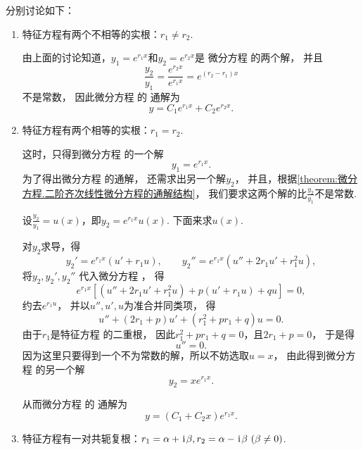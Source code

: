 分别讨论如下：\begin{enumerate}
	\item 特征方程有两个不相等的实根：\(r_1 \neq r_2\).

	由上面的讨论知道，\(y_1 = e^{r_1 x}\)和\(y_2 = e^{r_2 x}\)是
	微分方程  的两个解，
	并且\[
		\frac{y_2}{y_1} = \frac{e^{r_2 x}}{e^{r_1 x}} = e^{(r_2-r_1) x}
	\]不是常数，
	因此微分方程  的
	通解为\begin{equation}
		y = C_1 e^{r_1 x} + C_2 e^{r_2 x}.
	\end{equation}

	\item 特征方程有两个相等的实根：\(r_1 = r_2\).

	这时，只得到微分方程  的一个解\[
		y_1 = e^{r_1 x}.
	\]
	为了得出微分方程  的通解，
	还需求出另一个解\(y_2\)，
	并且，根据\cref{theorem:微分方程.二阶齐次线性微分方程的通解结构}，
	我们要求这两个解的比\(\frac{y_2}{y_1}\)不是常数.

	设\(\frac{y_2}{y_1} = u(x)\)，即\(y_2 = e^{r_1 x} u(x)\).
	下面来求\(u(x)\).

	对\(y_2\)求导，得\[
		y_2' = e^{r_1 x} (u' + r_1 u),
		\qquad
		y_2'' = e^{r_1 x} (u'' + 2 r_1 u' + r_1^2 u),
	\]
	将\(y_2,y_2',y_2''\)
	代入微分方程 ，
	得\[
		e^{r_1 x} [(u'' + 2 r_1 u' + r_1^2 u) + p(u' + r_1 u) + qu] = 0,
	\]
	约去\(e^{r_1 u}\)，
	并以\(u'',u',u\)为准合并同类项，
	得\[
		u'' + (2 r_1 + p) u' + (r_1^2 + p r_1 + q) u = 0.
	\]
	由于\(r_1\)是特征方程  的二重根，
	因此\(r_1^2 + p r_1 + q = 0\)，且\(2 r_1 + p = 0\)，
	于是得\[
		u'' = 0.
	\]
	因为这里只要得到一个不为常数的解，所以不妨选取\(u = x\)，
	由此得到微分方程  的另一个解\[
		y_2 = x e^{r_1 x}.
	\]

	从而微分方程  的
	通解为\begin{equation}
		y = (C_1 + C_2 x) e^{r_1 x}.
	\end{equation}

	\item 特征方程有一对共轭复根：\(r_1 = \alpha+\kern1pt\mathrm{i}\kern1pt\beta, r_2 = \alpha-\kern1pt\mathrm{i}\kern1pt\beta \ (\beta\neq0)\).


\end{enumerate}
